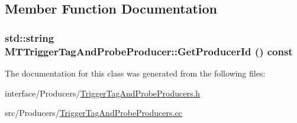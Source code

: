 \subsection{Member Function Documentation}
\hypertarget{classMTTriggerTagAndProbeProducer_a6f6e0acf339e563d7e0b697abc53bac2}{
\subsubsection[{GetProducerId}]{\setlength{\rightskip}{0pt plus 5cm}std::string MTTriggerTagAndProbeProducer::GetProducerId () const}}
\label{classMTTriggerTagAndProbeProducer_a6f6e0acf339e563d7e0b697abc53bac2}


The documentation for this class was generated from the following files:\begin{DoxyCompactItemize}
\item 
interface/Producers/\hyperlink{TriggerTagAndProbeProducers_8h}{TriggerTagAndProbeProducers.h}\item 
src/Producers/\hyperlink{TriggerTagAndProbeProducers_8cc}{TriggerTagAndProbeProducers.cc}\end{DoxyCompactItemize}
